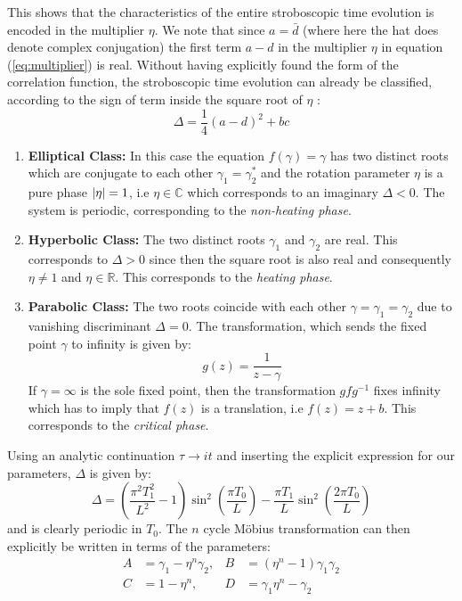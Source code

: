 \documentclass[11pt, a4paper, oneside]{book}
\theoremstyle{definition} %
\begin{document}
This shows that the characteristics of the entire stroboscopic time evolution is encoded in the multiplier $\eta$. We note that since $a = \bar{d}$ (where here the hat does denote complex conjugation) the first term $a - d$ in the multiplier $\eta$ in equation (\ref{eq:multiplier}) is real. Without having explicitly found the form of the correlation function, the stroboscopic time evolution can already be classified, according to the sign of term inside the square root of $\eta$ \cite{Andersen}:
\begin{equation}
	\Delta = \frac{1}{4} (a -d)^2 + bc
\end{equation}
\begin{enumerate}
	\item \textbf{Elliptical Class:} In this case the equation $f(\gamma) = \gamma$ has two distinct roots which are conjugate to each other $\gamma_1 = \gamma_2^*$ and the rotation parameter $\eta$ is a pure phase $\abs{\eta}=1$, i.e $\eta \in \mathbb{C}$  which corresponds to an imaginary $\Delta < 0$. The system is periodic, corresponding to the \textit{non-heating phase}.
	\item \textbf{Hyperbolic Class:} The two distinct roots $\gamma_1$ and $\gamma_2$ are real. This corresponds to $\Delta > 0$ since then the square root is also real and consequently $\eta \neq 1$ and $\eta \in \mathbb{R}$. This corresponds to the \textit{heating phase}.
	\item \textbf{Parabolic Class:} The two roots coincide with each other $\gamma = \gamma_1 = \gamma_2$ due to vanishing discriminant $\Delta = 0$. The transformation, which sends the fixed point $\gamma $ to infinity is given by:
	\begin{equation}
		g(z) = \frac{1}{z -\gamma}
	\end{equation}
	If $\gamma = \infty$ is the sole fixed point, then the transformation $gfg^{-1}$ fixes infinity which has to imply that $f(z)$ is a translation, i.e $f(z) = z + b$. This corresponds to the \textit{critical phase}.
\end{enumerate}

Using an analytic continuation $\tau \rightarrow it$ and inserting the explicit expression for our parameters, $\Delta$ is given by:
\begin{equation}
	\Delta = \left( \frac{\pi^2 T_1^2}{L^2} - 1\right)\sin^2\left(\frac{\pi T_0}{L}\right) - \frac{\pi T_1}{L}\sin^2\left( \frac{2\pi T_0}{L}\right)
	\label{eq:Delta}
\end{equation}
and is clearly periodic in $T_0$. The $n$ cycle Möbius transformation can then explicitly be written in terms of the parameters:
\begin{align}
	A &= \gamma_1 - \eta^n \gamma_2, & B &= (\eta^n - 1) \gamma_1 \gamma_2 \\
	C &= 1 - \eta^n, & D &= \gamma_1 \eta^n - \gamma_2
\end{align}
\end{document}
